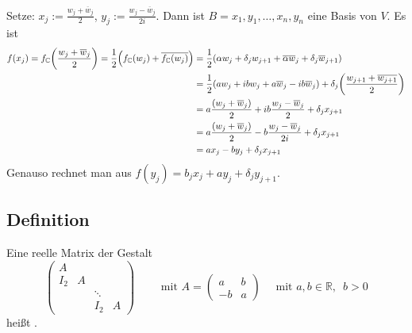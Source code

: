 Setze: $x_j := \frac{w_j + \overline{w}_j }{2} $, $y_j := \frac{w_j - \overline{w}_j }{2i} $. Dann ist $B=x_1, y_1, \ldots , x_n, y_n$ eine Basis von $V$. Es ist
\begin{align*}
	f(x_j) = f_\mathds{C} \enbrace*{\frac{w_j + \overline{w}_j }{2} } = \frac{1}{2} \enbrace*{f_\mathds{C}(w_j) + \overline{f_\mathds{C} (w_j)}}   &=
	\frac{1}{2} \enbrace*{ \alpha w_j + \delta_j w_{j+1} + \overline{\alpha} \overline{w}_j + \delta_j \overline{w}_{j+1}   }\\
	 &= \frac{1}{2} (a w_j + i b w_j + a \overline{w}_j
	- i b \overline{w}_j  ) + \delta_j \enbrace*{\frac{w_{j+1} + \overline{w_{j+1}} }{2} }  \\
	&= a \frac{(w_j + \overline{w}_j )}{2} + i b \frac{w_j - \overline{w}_j }{2}  + \delta_j x_{j+1} \\
	&= a \frac{(w_j + \overline{w}_j )}{2} -  b \frac{w_j - \overline{w}_j }{2i}  + \delta_j x_{j+1} \\
	&= a x_j - b y_j + \delta_j x_{j+1}
\end{align*}
Genauso rechnet man aus $f(y_j) = b_j x_j + a y_j + \delta_j y_{j+1}$. \bewende

\subsection[Definition: verallgemeinerter Jordankasten]{Definition} %
\label{sub:118}
Eine reelle Matrix der Gestalt
\[
	\begin{pmatrix}
		A & & & \\
		I_2 & A & & \\
		& & \ddots & \\
		& & I_2 & A
	\end{pmatrix} \qquad \text{ mit } A= \begin{pmatrix}
		a &b \\
		-b &a
	\end{pmatrix} \quad \text{ mit } a,b \in \mathds{R}, \enspace b>0
\]
heißt . 

